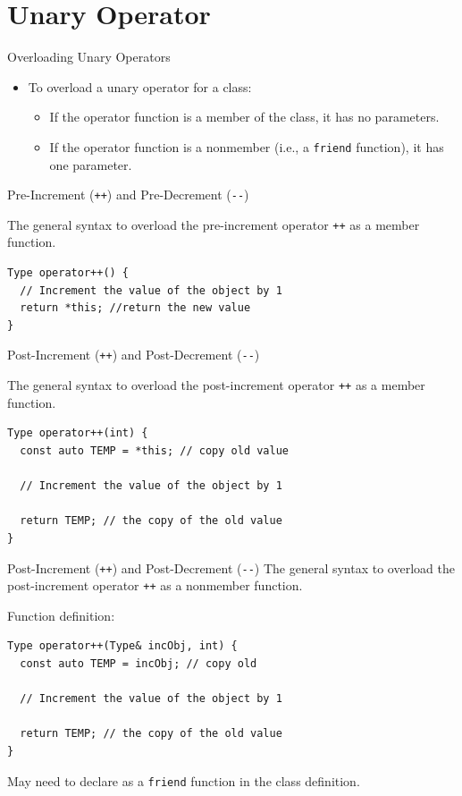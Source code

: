 \documentclass[14pt,aspectratio=1610, hyperref={pdfpagelayout=SinglePage}]{beamer}
\begin{document}
\section{Unary Operator}

\begin{frame}[fragile]{Overloading Unary Operators}
\begin{itemize}
\item
  To overload a unary operator for a class:
  \begin{itemize}
  \item
    If the operator function is a member of the class, it has no
    parameters.
  \item
    If the operator function is a nonmember (i.e., a \lstinline{friend}
    function), it has one parameter.
  \end{itemize}
\end{itemize}
\end{frame}

\begin{frame}[fragile]{Pre-Increment (\texttt{++}) and
Pre-Decrement (\texttt{{-}-})}

The general syntax to overload the pre-increment operator \lstinline{++} as a member function.

\begin{lstlisting}
Type operator++() {
  // Increment the value of the object by 1
  return *this; //return the new value
}
\end{lstlisting}
\end{frame}

\begin{frame}[fragile]{Post-Increment (\texttt{++}) and
Post-Decrement (\texttt{{-}-})}

The general syntax to overload the post-increment operator \lstinline{++} as
a member function.

\begin{lstlisting}
Type operator++(int) {
  const auto TEMP = *this; // copy old value

  // Increment the value of the object by 1

  return TEMP; // the copy of the old value
}
\end{lstlisting}
\end{frame}

\begin{frame}[fragile]{Post-Increment (\texttt{++}) and
Post-Decrement (\texttt{{-}-})}
The general syntax to overload the post-increment operator \lstinline{++} as
  a nonmember function.

Function definition:
\begin{lstlisting}
Type operator++(Type& incObj, int) {
  const auto TEMP = incObj; // copy old

  // Increment the value of the object by 1

  return TEMP; // the copy of the old value
}
\end{lstlisting}
May need to declare as a \lstinline{friend} function in the class definition.
\end{frame}
\end{document}
